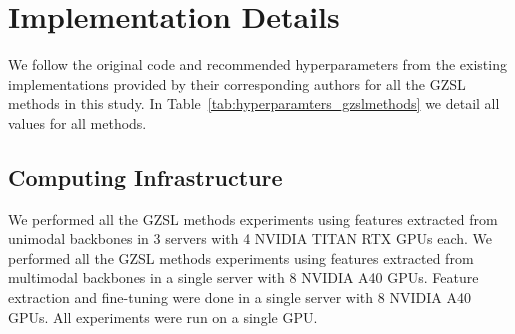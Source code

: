 \section{Implementation Details}
\label{sec:implementation_details}

We follow the original code and recommended hyperparameters from the existing implementations provided by their corresponding authors for all the GZSL methods in this study. In Table~\ref{tab:hyperparamters_gzslmethods} we detail all values for all methods.

\subsection{Computing Infrastructure}

We performed all the GZSL methods experiments using features extracted from unimodal backbones in 3 servers with 4 NVIDIA TITAN RTX GPUs each. 
We performed all the GZSL methods experiments using features extracted from multimodal backbones in a single server with 8 NVIDIA A40 GPUs. 
Feature extraction and fine-tuning were done in a single server with 8 NVIDIA A40 GPUs.
All experiments were run on a single GPU.


